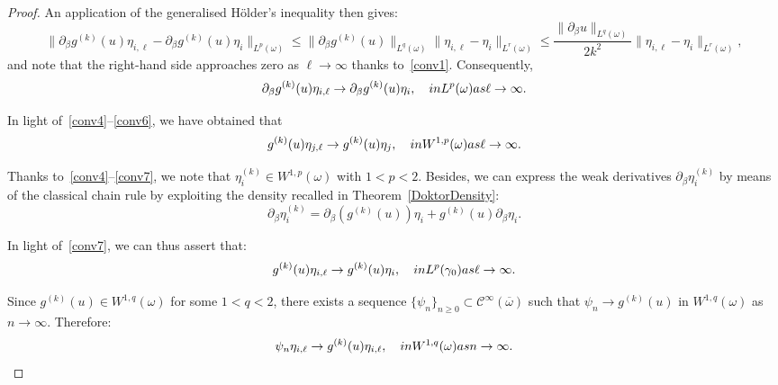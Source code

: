 \documentclass{amsart}
\begin{document}
\begin{proof}
	An application of the generalised H\"older's inequality then gives:
	\begin{equation}
		\label{est:4}
		\|\partial_\beta g^{(k)}(u)\eta_{i,\ell}-\partial_\beta g^{(k)}(u)\eta_i\|_{L^p(\omega)} \le \|\partial_\beta g^{(k)}(u)\|_{L^q(\omega)}\|\eta_{i,\ell}-\eta_i\|_{L^r(\omega)}\le \dfrac{\|\partial_\beta u\|_{L^q(\omega)}}{2k^2}\|\eta_{i,\ell}-\eta_i\|_{L^r(\omega)},
	\end{equation}
	and note that the right-hand side approaches zero as $\ell\to\infty$ thanks to~\eqref{conv1}. Consequently,
	\begin{equation}
		\label{conv6}
		\partial_\beta g^{(k)}(u)\eta_{i,\ell} \to \partial_\beta g^{(k)}(u)\eta_i,\quad\textup{ in }L^p(\omega) \textup{ as }\ell\to\infty.
	\end{equation}
	
	In light of~\eqref{conv4}--\eqref{conv6}, we have obtained that
	\begin{equation}
		\label{conv7}
		g^{(k)}(u)\eta_{j,\ell} \to g^{(k)}(u)\eta_j,\quad\textup{ in }W^{1,p}(\omega) \textup{ as }\ell\to\infty.
	\end{equation}
	
	Thanks to~\eqref{conv4}--\eqref{conv7}, we note that $\eta_i^{(k)} \in W^{1,p}(\omega)$ with $1<p<2$. Besides, we can express the weak derivatives $\partial_\beta\eta_i^{(k)}$ by means of the classical chain rule by exploiting the density recalled in Theorem~\ref{DoktorDensity}:
	\begin{equation}
		\label{wdk}
		\partial_\beta \eta_i^{(k)}=\partial_\beta(g^{(k)}(u)) \eta_i+g^{(k)}(u) \partial_\beta \eta_i.
	\end{equation}
	
	In light of~\eqref{conv7}, we can thus assert that:
	\begin{equation}
		\label{tr1}
		g^{(k)}(u) \eta_{i,\ell} \to g^{(k)}(u) \eta_i,\quad\textup{ in }L^p(\gamma_0) \textup{ as }\ell\to\infty.
	\end{equation}
	
	Since $g^{(k)}(u) \in W^{1,q}(\omega)$ for some $1<q<2$, there exists a sequence $\{\psi_n\}_{n\ge 0} \subset \mathcal{C}^\infty(\overline{\omega})$ such that $\psi_n \to g^{(k)}(u)$ in $W^{1,q}(\omega)$ as $n\to\infty$. Therefore:
	\begin{equation}
		\label{tr2}
		\psi_n \eta_{i,\ell} \to g^{(k)}(u) \eta_{i,\ell},\quad\textup{ in }W^{1,q}(\omega) \textup{ as }n\to\infty.
	\end{equation}
	

\end{proof}
\end{document}

